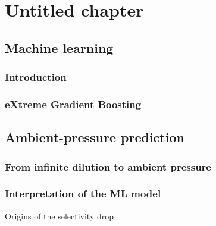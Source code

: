 \documentclass[main]{subfiles}
\begin{document}
\chapter{Untitled chapter}
\vspace*{-1\baselineskip}
\section{Machine learning}

\subsection{Introduction}

\subsection{eXtreme Gradient Boosting}

\section{Ambient-pressure prediction}

\subsection{From infinite dilution to ambient pressure}

\subsection{Interpretation of the ML model}

Origins of the selectivity drop

\OnlyInSubfile{\printglobalbibliography}
\end{document}
